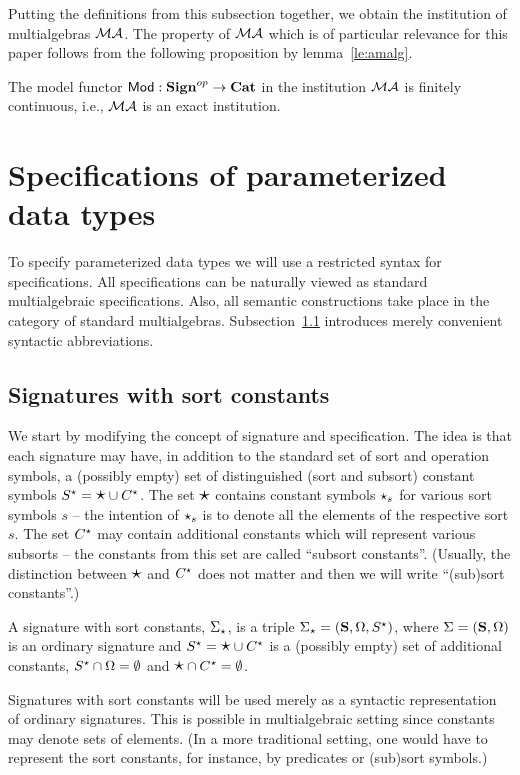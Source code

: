 %
Putting the definitions from this subsection together, we obtain the institution of 
multialgebras ${\mathcal{MA}}$.
The property of ${\mathcal{MA}}$ which is of particular relevance for this paper
follows from the following proposition by lemma~\ref{le:amalg}.
\begin{proposition}
The model functor ${\sf {Mod}}:{\bf Sign}^{op}\to{\bf Cat}$ in the institution
${\mathcal{MA}}$ is finitely continuous, i.e., ${\mathcal{MA}}$ is an exact institution.
\end{proposition}

\section{Specifications of parameterized data types}\label{se:paraADT}
To specify parameterized data types we will use a restricted syntax for
specifications. All specifications can be naturally viewed as standard
multialgebraic specifications. Also, all semantic constructions take place in
the category of standard multialgebras. Subsection~\ref{sub:gsp} introduces
merely convenient syntactic abbreviations. 

%
\subsection{Signatures with sort constants}\label{sub:gsp}
We start by modifying the concept of signature and specification. The idea
is that each signature may have, in addition to the standard set of sort and
operation symbols, a (possibly empty) set of distinguished (sort and subsort) constant
symbols $S^\star = \mbox{\Large{$\star$}}\cup C^\star$. 
The set $\mbox{\Large{$\star$}}$ %
contains  constant symbols
$\star_s$ for various sort symbols $s$ -- the intention of $\star_s$ is to denote all the elements of the respective
sort $s$. 
The set $C^\star$  may contain additional constants
which will represent various subsorts -- the constants from this set are
called ``subsort constants''. (Usually, the distinction between $\mbox{\Large{$\star$}}$ and
$C^\star$ does not matter and then we will write ``(sub)sort constants''.)
\begin{definition}
\label{def:modsign}
A signature with sort constants, $\Sigma_\star$, is a triple $\Sigma_\star =
 ({\bf S},\Omega,S^\star)$, where $\Sigma=({\bf S},\Omega)$ is an ordinary
 signature and $S^\star=\mbox{\Large{$\star$}}\cup C^\star$ is a (possibly empty) set of additional constants,
 $S^\star\cap\Omega=\emptyset$ and $\mbox{\Large{$\star$}}\cap C^\star=\emptyset$. 
\end{definition}
%
Signatures with sort constants will be used merely as a syntactic representation of 
ordinary signatures. This is possible in multialgebraic setting since
constants may denote sets of elements. (In a more traditional setting, one would
have to represent the sort constants, for instance, by predicates or (sub)sort symbols.)

